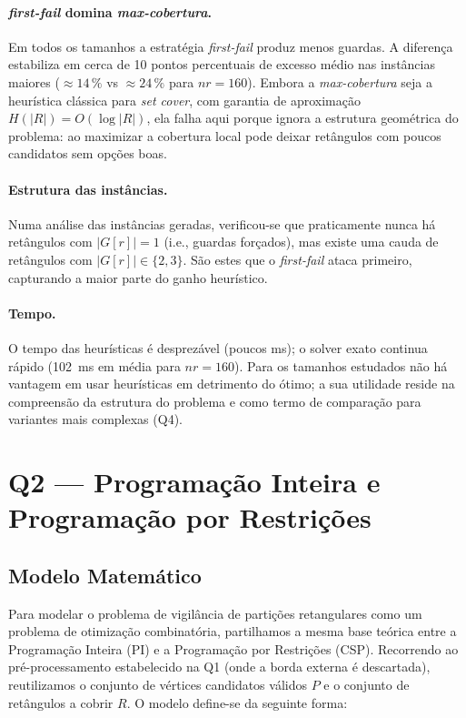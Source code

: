 \documentclass[11pt,a4paper]{article}
\begin{document}
\paragraph{\emph{first-fail} domina \emph{max-cobertura}.} Em todos os
tamanhos a estratégia \emph{first-fail} produz menos guardas. A diferença
estabiliza em cerca de 10 pontos percentuais de excesso médio nas
instâncias maiores ($\approx 14\,\%$ vs $\approx 24\,\%$ para $nr=160$).
Embora a \emph{max-cobertura} seja a heurística clássica para
\emph{set cover}, com garantia de aproximação $H(|R|) = O(\log |R|)$,
ela falha aqui porque ignora a estrutura geométrica do problema: ao
maximizar a cobertura local pode deixar retângulos com poucos candidatos
sem opções boas.

\paragraph{Estrutura das instâncias.} Numa análise das instâncias
geradas, verificou-se que praticamente nunca há retângulos com
$|G[r]|=1$ (i.e., guardas forçados), mas existe uma cauda de
retângulos com $|G[r]| \in \{2,3\}$. São estes que o \emph{first-fail}
ataca primeiro, capturando a maior parte do ganho heurístico.

\paragraph{Tempo.} O tempo das heurísticas é desprezável (poucos ms);
o solver exato continua rápido (102~ms em média para $nr=160$).
Para os tamanhos estudados não há vantagem em usar heurísticas em
detrimento do ótimo; a sua utilidade reside na compreensão da
estrutura do problema e como termo de comparação para variantes
mais complexas (Q4).


\section{Q2 --- Programação Inteira e Programação por Restrições}

\subsection{Modelo Matemático}

Para modelar o problema de vigilância de partições retangulares como
um problema de otimização combinatória, partilhamos a mesma base
teórica entre a Programação Inteira (PI) e a Programação por
Restrições (CSP). Recorrendo ao pré-processamento estabelecido na Q1
(onde a borda externa é descartada), reutilizamos o conjunto de
vértices candidatos válidos $P$ e o conjunto de retângulos a cobrir
$R$. O modelo define-se da seguinte forma:
\end{document}
